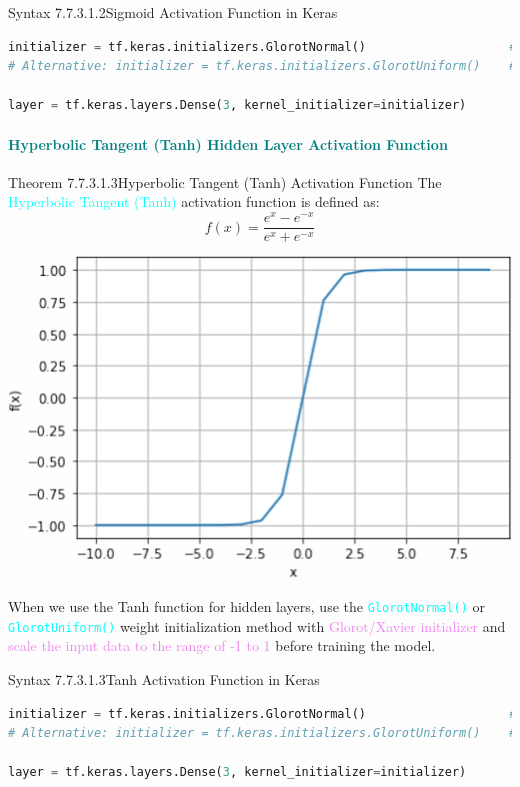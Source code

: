 \documentclass{book}
\begin{document}
\begin{synBox}{Syntax 7.7.3.1.2}{Sigmoid Activation Function in Keras}
\begin{lstlisting}[language=Python, basicstyle=\ttfamily\small, keywordstyle=\color{blue}, commentstyle=\color{forestgreen}, stringstyle=\color{red}, showstringspaces=false]
initializer = tf.keras.initializers.GlorotNormal()                    # GlorotNormal Method
# Alternative: initializer = tf.keras.initializers.GlorotUniform()    # GlorotUniform Method

layer = tf.keras.layers.Dense(3, kernel_initializer=initializer)
\end{lstlisting}
\end{synBox}
\newpage
\textcolor{teal}{\paragraph{Hyperbolic Tangent (Tanh) Hidden Layer Activation Function}}
\begin{thmBox}{Theorem 7.7.3.1.3}{Hyperbolic Tangent (Tanh) Activation Function}
    The \textcolor{cyan}{Hyperbolic Tangent (Tanh)} activation function is defined as:
    \[
        f(x) = \frac{e^{x}-e^{-x}}{e^{x}+e^{-x}}
    \]
    \begin{center}
        \includegraphics[scale=0.17]{chapter 7/ch7_figure34.jpeg}
    \end{center}
\end{thmBox}
When we use the Tanh function for hidden layers, use the \textcolor{cyan}{\texttt{GlorotNormal()}} or \textcolor{cyan}{\texttt{GlorotUniform()}} weight initialization method with \textcolor{violet}{Glorot/Xavier initializer} and \textcolor{violet}{scale the input data to the range of -1 to 1} before training the model.
\begin{synBox}{Syntax 7.7.3.1.3}{Tanh Activation Function in Keras}
\begin{lstlisting}[language=Python, basicstyle=\ttfamily\small, keywordstyle=\color{blue}, commentstyle=\color{forestgreen}, stringstyle=\color{red}, showstringspaces=false]
initializer = tf.keras.initializers.GlorotNormal()                    # GlorotNormal Method
# Alternative: initializer = tf.keras.initializers.GlorotUniform()    # GlorotUniform Method

layer = tf.keras.layers.Dense(3, kernel_initializer=initializer)
\end{lstlisting}
\end{synBox}
\end{document}
